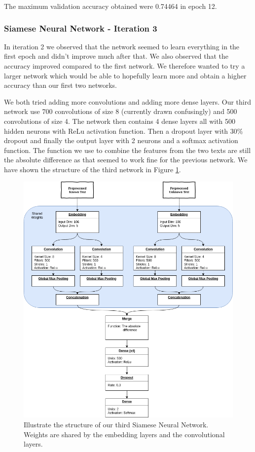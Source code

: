 The maximum validation accuracy obtained were 0.74464 in epoch 12.


\subsubsection{Siamese Neural Network - Iteration 3}

In iteration 2 we observed that the network seemed to learn everything in the
first epoch and didn't improve much after that. We also observed that the
accuracy improved compared to the first network. We therefore wanted to try a
larger network which would be able to hopefully learn more and obtain a higher
accuracy than our first two networks.

We both tried adding more convolutions and adding more dense layers. Our third
network use 700 convolutions of size 8 (currently drawn confusingly) and 500
convolutions of size 4. The network then contains 4 dense layers all with 500
hidden neurons with \gls{ReLu} activation function. Then a dropout layer with
30\% dropout and finally the output layer with 2 neurons and a softmax
activation function. The function we use to combine the features from the two
texts are still the absolute difference as that seemed to work fine for the
previous network. We have shown the structure of the third network in Figure
\ref{fig:network3}.

\begin{figure}
    \centering
    \includegraphics[width=\textwidth]{./pictures/experiments/network3/network3.png}
    \caption{Illustrate the structure of our third Siamese Neural Network.
        Weights are shared by the embedding layers and the convolutional
        layers.}
    \label{fig:network3}
\end{figure}

